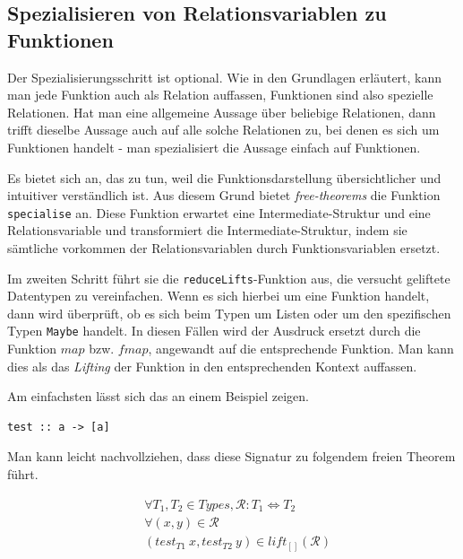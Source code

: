 \subsection{Spezialisieren von Relationsvariablen zu Funktionen}

\label{sec:specialise-relvars}

Der Spezialisierungsschritt ist optional. Wie in den Grundlagen erläutert, kann man jede Funktion auch als Relation auffassen,
Funktionen sind also spezielle Relationen. Hat man eine allgemeine Aussage über beliebige Relationen, dann trifft dieselbe
Aussage auch auf alle solche Relationen zu, bei denen es sich um Funktionen handelt - man spezialisiert die Aussage einfach
auf Funktionen.

Es bietet sich an, das zu tun, weil die Funktionsdarstellung übersichtlicher und intuitiver verständlich ist. Aus diesem Grund
bietet \textit{free-theorems} die Funktion \texttt{specialise} an. Diese Funktion erwartet eine Intermediate-Struktur und
eine Relationsvariable und transformiert die Intermediate-Struktur, indem sie sämtliche vorkommen der Relationsvariablen
durch Funktionsvariablen ersetzt.

Im zweiten Schritt führt sie die \texttt{reduceLifts}-Funktion aus, die versucht geliftete Datentypen zu vereinfachen.
 Wenn es sich hierbei um eine Funktion handelt, dann wird überprüft, ob es sich beim Typen
um Listen oder um den spezifischen Typen \texttt{Maybe} handelt. In diesen Fällen wird der Ausdruck ersetzt durch die
Funktion $map$ bzw. $fmap$, angewandt auf die entsprechende Funktion. Man kann dies als das \textit{Lifting} der Funktion
in den entsprechenden Kontext auffassen.

Am einfachsten lässt sich das an einem Beispiel zeigen.

\begin{verbatim}
test :: a -> [a]
\end{verbatim}

Man kann leicht nachvollziehen, dass diese Signatur zu folgendem freien Theorem führt.

\begin{align*}
& \forall T_1, T_2 \in Types, \mathcal{R} : T_1 \Leftrightarrow T_2 \\
& \forall (x, y) \in \mathcal{R} \\
& (test_{T1}\ x, test_{T2}\ y) \in lift_{[]}(\mathcal{R})
\end{align*}

